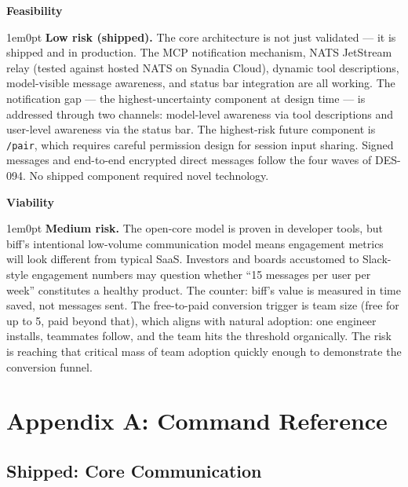 \documentclass[11pt,letterpaper]{article}
\newcommand{\riskitem}[2]{%
  \vspace{0.4em}%
  \noindent\textbf{\color{SectionBlue}#1}\par%
  \vspace{0.1em}%
  \begin{adjustwidth}{1em}{0pt}%
    #2%
  \end{adjustwidth}%
}
\begin{document}
\begin{mdframed}[
  linewidth=0.5pt,
  linecolor=QuoteBorder,
  backgroundcolor=BoxBg,
  innerleftmargin=10pt,
  innerrightmargin=10pt,
  innertopmargin=10pt,
  innerbottommargin=10pt,
  nobreak=true,
]
\riskitem{Feasibility}{%
  \textbf{Low risk (shipped).} The core architecture is not just validated
  --- it is shipped and in production. The MCP notification mechanism,
  NATS JetStream relay (tested against hosted NATS on Synadia Cloud),
  dynamic tool descriptions, model-visible message awareness, and status
  bar integration are all working. The notification gap --- the
  highest-uncertainty component at design time --- is addressed through two
  channels: model-level awareness via tool descriptions and user-level
  awareness via the status bar. The highest-risk future component is
  \texttt{/pair}, which requires careful permission design for session
  input sharing. Signed messages and end-to-end encrypted direct
  messages follow the four waves of DES-094. No shipped component required novel technology.}

\riskitem{Viability}{%
  \textbf{Medium risk.} The open-core model is proven in developer tools,
  but biff's intentional low-volume communication model means engagement
  metrics will look different from typical SaaS. Investors and boards
  accustomed to Slack-style engagement numbers may question whether ``15
  messages per user per week'' constitutes a healthy product. The counter:
  biff's value is measured in time saved, not messages sent. The free-to-paid
  conversion trigger is team size (free for up to 5, paid beyond that),
  which aligns with natural adoption: one engineer installs, teammates
  follow, and the team hits the threshold organically. The risk is
  reaching that critical mass of team adoption quickly enough to
  demonstrate the conversion funnel.}

\end{mdframed}

\newpage


\section*{Appendix A: Command Reference}

\subsection*{Shipped: Core Communication}
\end{document}
